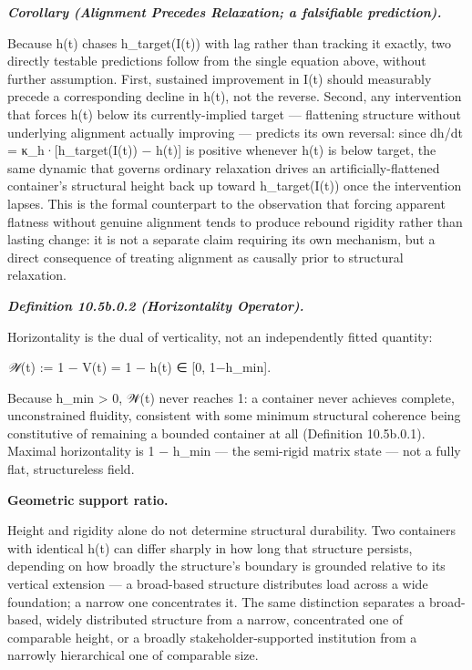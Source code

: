 \documentclass[
]{article}
\begin{document}
\emph{\textbf{Corollary (Alignment Precedes Relaxation; a falsifiable
prediction).}}

Because h(t) chases h\_target(I(t)) with lag rather than tracking it
exactly, two directly testable predictions follow from the single
equation above, without further assumption. First, sustained improvement
in I(t) should measurably precede a corresponding decline in h(t), not
the reverse. Second, any intervention that forces h(t) below its
currently-implied target --- flattening structure without underlying
alignment actually improving --- predicts its own reversal: since dh/dt
= κ\_h·{[}h\_target(I(t)) − h(t){]} is positive whenever h(t) is below
target, the same dynamic that governs ordinary relaxation drives an
artificially-flattened container's structural height back up toward
h\_target(I(t)) once the intervention lapses. This is the formal
counterpart to the observation that forcing apparent flatness without
genuine alignment tends to produce rebound rigidity rather than lasting
change: it is not a separate claim requiring its own mechanism, but a
direct consequence of treating alignment as causally prior to structural
relaxation.

\emph{\textbf{Definition 10.5b.0.2 (Horizontality Operator).}}

Horizontality is the dual of verticality, not an independently fitted
quantity:

\emph{𝒲}(t) := 1 − V(t) = 1 − h(t) ∈ {[}0, 1−h\_min{]}.

Because h\_min \textgreater{} 0, 𝒲(t) never reaches 1: a container never
achieves complete, unconstrained fluidity, consistent with some minimum
structural coherence being constitutive of remaining a bounded container
at all (Definition 10.5b.0.1). Maximal horizontality is 1 − h\_min ---
the semi-rigid matrix state --- not a fully flat, structureless field.

\textbf{Geometric support ratio.}

Height and rigidity alone do not determine structural durability. Two
containers with identical h(t) can differ sharply in how long that
structure persists, depending on how broadly the structure's boundary is
grounded relative to its vertical extension --- a broad-based structure
distributes load across a wide foundation; a narrow one concentrates it.
The same distinction separates a broad-based, widely distributed
structure from a narrow, concentrated one of comparable height, or a
broadly stakeholder-supported institution from a narrowly hierarchical
one of comparable size.
\end{document}
